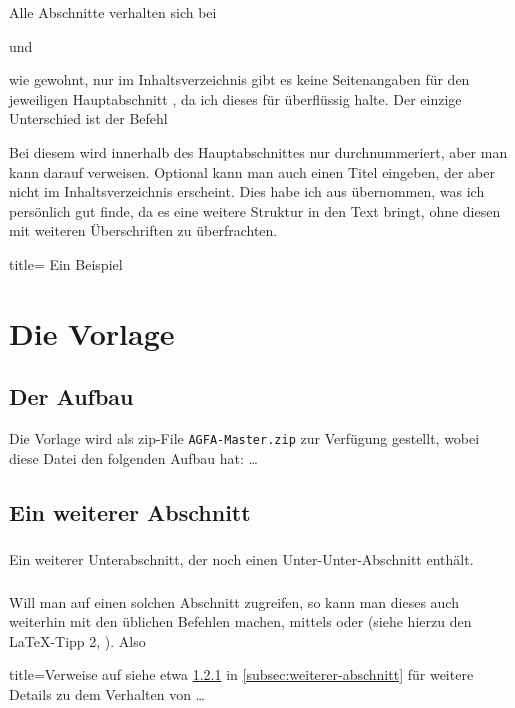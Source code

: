 Alle Abschnitte verhalten sich bei 
%
\begin{tcolorbox}
\end{tcolorbox}
%
und
%
\begin{tcolorbox}
\end{tcolorbox}
%
wie gewohnt, nur im Inhaltsverzeichnis gibt es keine Seitenangaben für den jeweiligen Hauptabschnitt , da ich dieses für überflüssig halte.
Der einzige Unterschied ist der Befehl
%
\begin{tcolorbox}
\brackets{}
\end{tcolorbox}
%
Bei diesem wird innerhalb des Hauptabschnittes nur durchnummeriert, aber man kann darauf verweisen.
Optional kann man auch einen Titel eingeben, der aber nicht im Inhaltsverzeichnis erscheint.
Dies habe ich aus \textcite{bourbaki:spectrales} übernommen, was ich persönlich gut finde, da es eine weitere Struktur in den Text bringt, ohne diesen mit weiteren Überschriften zu überfrachten.
%
\begin{NoTOCEntry}
\renewcommand*{\theHsection}{bsp.\arabic{section}}
\begin{tcblisting}{title= Ein Beispiel}
\section{Die Vorlage}\label{sec:bsp-vorlage}
\subsection{Der Aufbau}\label{subsec:bsp-aufbau}
Die Vorlage wird als zip-File \texttt{AGFA-Master.zip} zur Verfügung gestellt, wobei diese Datei den folgenden Aufbau hat: \ldots
\subsection{Ein weiterer Abschnitt}\label{subsec:weiterer-abschnitt}
\subsubsection{}\label{subsubsec:bsp-test}
Ein weiterer Unterabschnitt, der noch einen Unter-Unter-Abschnitt enthält. 
\end{tcblisting}
\end{NoTOCEntry}
\subsubsection{}
Will man auf einen solchen Abschnitt zugreifen, so kann man dieses auch weiterhin mit den üblichen Befehlen machen, \dh mittels  oder  (siehe hierzu den \LaTeX{}-Tipp 2, \cite{latextipps2}).
Also
%
\begin{tcblisting}{title=Verweise auf  }
siehe etwa \ref{subsubsec:bsp-test} in \vref{subsec:weiterer-abschnitt} für weitere Details zu dem Verhalten von \ldots
\end{tcblisting}
%
